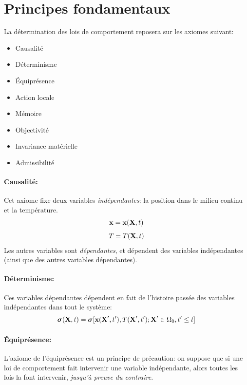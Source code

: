 \section{Principes fondamentaux}
La détermination des lois de comportement reposera sur les axiomes suivant:
\begin{itemize}
\item Causalité
\item Déterminisme
\item \'Equiprésence
\item Action locale
\item Mémoire
\item Objectivité
\item Invariance matérielle
\item Admissibilité
\end{itemize}

\paragraph{Causalité: } Cet axiome fixe deux variables \emph{indépendantes}: la position dans le milieu continu et la température. $$\textbf{x}=\textbf{x}(\textbf{X},t)$$ $$T=T(\textbf{X},t)$$
Les autres variables sont \emph{dépendantes}, et dépendent des variables indépendantes (ainsi que des autres variables dépendantes).
\paragraph{Déterminisme: } Ces variables dépendantes dépendent en fait de l'histoire passée des variables indépendantes dans tout le système:
$$\boldsymbol{\sigma}(\textbf{X},t)=\boldsymbol{\sigma}[\textbf{x}(\textbf{X}',t'), T(\textbf{X}',t');\textbf{X}'\in \Omega_0, t'\leq t]$$
\paragraph{\'Equiprésence: } L'axiome de l'équiprésence est un principe de précaution: on suppose que si une loi de comportement fait intervenir une variable indépendante, alors toutes les lois la font intervenir, \emph{jusqu'à preuve du contraire}.
